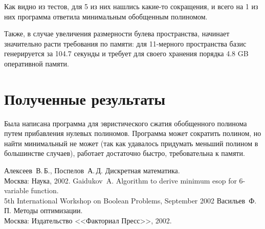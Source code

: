 \documentclass[a4paper,12pt,titlepage,finall]{article}
\begin{document}
Как видно из тестов, для 5 из них нашлись какие-то сокращения, и всего на 1 из них программа ответила минимальным обобщенным полиномом.

Также, в случае увеличения размерности булева пространства, начинает значительно расти требования по памяти: для 11-мерного пространства базис генерируется за 104.7 секунды и требует для своего хранения порядка 4.8 GB оперативной памяти.

\section{Полученные результаты}

Была написана программа для эвристического сжатия обобщенного полинома путем прибавления нулевых полиномов. Программа может сократить полином, но найти минимальный не может (так как удавалось придумать меньший полином в большинстве случаев), работает достаточно быстро, требовательна к памяти.

\begin{raggedright}
\begin{thebibliography}{99}
     Алексеев~В.\,Б., Поспелов~А.\,Д. Дискретная математика.\\Москва: Наука, 2002.
     Gaidukov~A. Algorithm to derive minimum esop for 6-variable function.\\5th International Workshop on Boolean Problems, September 2002
     Васильев~Ф.\,П. Методы оптимизации.\\Москва: Издательство <<Факториал Пресс>>, 2002.
\end{thebibliography}
\end{raggedright}
\end{document}
